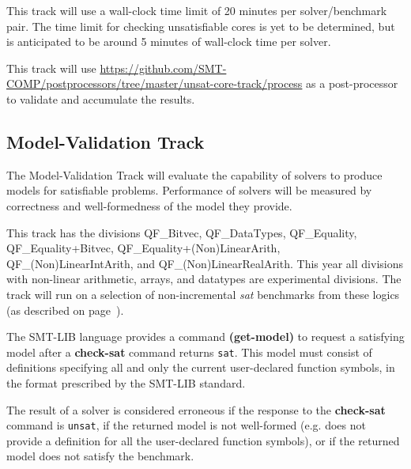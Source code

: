 \documentclass[12pt]{article}
\newcommand{\akey}[1]{\textbf{#1}\xspace}
\newcommand{\mvaltrack}{Model-Validation Track\xspace}
\begin{document}
This track will use a wall-clock time limit of 20 minutes per solver/benchmark
pair. The time limit for checking unsatisfiable cores is yet to be determined,
but is anticipated to be around 5 minutes of wall-clock time per solver.

This track will use
{\url{https://github.com/SMT-COMP/postprocessors/tree/master/unsat-core-track/process}}
as a post-processor
to validate and accumulate the results.

\subsection{\mvaltrack}
\label{sec:exec:model}
The \mvaltrack will evaluate the capability of solvers to produce models for
satisfiable problems.  Performance of solvers will be measured by correctness
and well-formedness of the model they provide.

  This track has the divisions QF\_Bitvec,
QF\_DataTypes, QF\_Equality,
QF\_Equality+Bitvec,
QF\_Equality+(Non)LinearArith,
QF\_(Non)LinearIntArith, and QF\_(Non)\-LinearRealArith.
This year all divisions with non-linear arithmetic, arrays, and datatypes
are experimental divisions.
%
The track will run on a
selection of non-incremental \emph{sat} benchmarks from these
logics (as described on page~\pageref{benchmark-selection}).

The SMT-LIB language provides a command \akey{(get-model)} to request a
satisfying model after a \akey{check-sat} command returns \texttt{sat}.  This
model must consist of definitions specifying all and only the current
user-declared function symbols, in the format prescribed by the SMT-LIB
standard.

The result of a solver is considered erroneous if the response to the
\akey{check-sat} command is \texttt{unsat}, if the returned model is not
well-formed (e.g. does not provide a definition for all the user-declared
function symbols), or if the returned model does not satisfy the benchmark.
\end{document}
